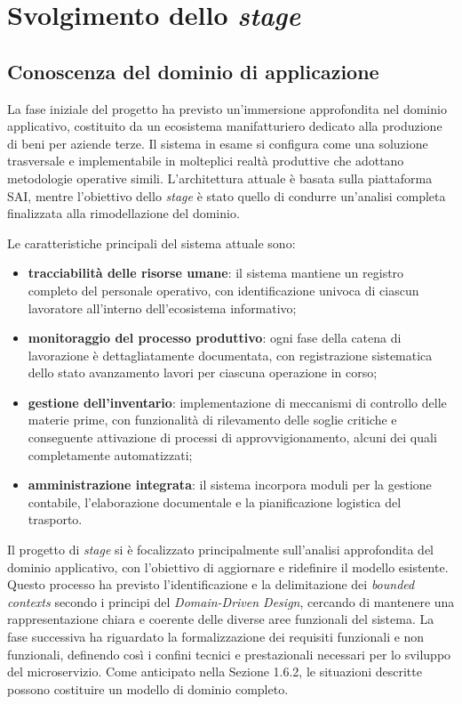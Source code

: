 \chapter{Svolgimento dello \textit{stage}}
    \section{Conoscenza del dominio di applicazione}
    La fase iniziale del progetto ha previsto un'immersione approfondita nel dominio applicativo, costituito da un ecosistema manifatturiero dedicato alla produzione di beni per aziende terze. Il sistema in esame si configura come una soluzione trasversale e implementabile in molteplici realtà produttive che adottano metodologie operative simili. L'architettura attuale è basata sulla piattaforma SAI, mentre l'obiettivo dello \textit{stage} è stato quello di condurre un'analisi completa finalizzata alla rimodellazione del dominio.

    \vspace{0.2 em}
    \noindent Le caratteristiche principali del sistema attuale sono:

    \begin{itemize}
        \item \textbf{tracciabilità delle risorse umane}: il sistema mantiene un registro completo del personale operativo, con identificazione univoca di ciascun lavoratore all'interno dell'ecosistema informativo;

        \item \textbf{monitoraggio del processo produttivo}: ogni fase della catena di lavorazione è dettagliatamente documentata, con registrazione sistematica dello stato avanzamento lavori per ciascuna operazione in corso;

        \item \textbf{gestione dell'inventario}: implementazione di meccanismi di controllo delle materie prime, con funzionalità di rilevamento delle soglie critiche e conseguente attivazione di processi di approvvigionamento, alcuni dei quali completamente automatizzati;

        \item \textbf{amministrazione integrata}: il sistema incorpora moduli per la gestione contabile, l'elaborazione documentale e la pianificazione logistica del trasporto.

    \end{itemize}
    
    \vspace{0.2 em}
    \noindent Il progetto di \textit{stage} si è focalizzato principalmente sull’analisi approfondita del dominio applicativo, con l’obiettivo di aggiornare e ridefinire il modello esistente. Questo processo ha previsto l’identificazione e la delimitazione dei \textit{bounded contexts} secondo i principi del \textit{Domain-Driven Design}, cercando di mantenere una rappresentazione chiara e coerente delle diverse aree funzionali del sistema. La fase successiva ha riguardato la formalizzazione dei requisiti funzionali e non funzionali, definendo così i confini tecnici e prestazionali necessari per lo sviluppo del microservizio. Come anticipato nella Sezione 1.6.2, le situazioni descritte possono costituire un modello di dominio completo.  


